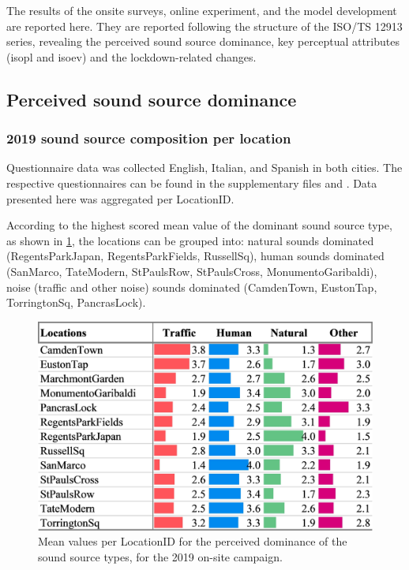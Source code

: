  The results of the onsite surveys, online experiment, and the model development are reported here. They are reported following the structure of the ISO/TS 12913 series, revealing the perceived sound source dominance, key perceptual attributes (\gls{isopl} and \gls{isoev}) and the lockdown-related changes.

 \subsection{Perceived sound source dominance}

   \subsubsection{2019 sound source composition per location}

   Questionnaire data was collected English, Italian, and Spanish in both cities. The respective questionnaires can be found in the supplementary files and \citet{Mitchell2020Soundscape}. Data presented here was aggregated per LocationID.

   According to the highest scored mean value of the dominant sound source type, as shown in \cref{fig:sound-source-dom}, the locations can be grouped into: natural sounds dominated (RegentsParkJapan, RegentsParkFields, RussellSq), human sounds dominated (SanMarco, TateModern, StPaulsRow, StPaulsCross, MonumentoGaribaldi), noise (traffic and other noise) sounds dominated (CamdenTown, EustonTap, TorringtonSq, PancrasLock).

   \begin{figure}[h]
     \centering
     \includegraphics[width=.8\textwidth]{Figures/Lockdown-Fig2.jpg}
     \caption{Mean values per LocationID for the perceived dominance of the sound source types, for the 2019 on-site campaign. \label{fig:sound-source-dom}}
   \end{figure}

